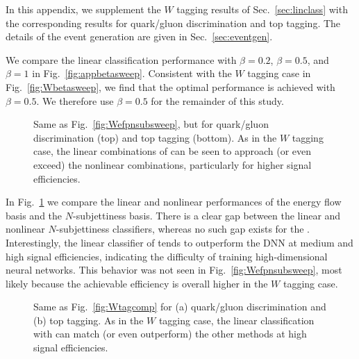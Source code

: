 \documentclass[letterpaper,11pt]{article}
\DeclareRobustCommand{\Sec}[1]{Sec.~\ref{#1}}
\DeclareRobustCommand{\Fig}[1]{Fig.~\ref{#1}}
\newcommand{\B}{\text{EFP}\xspace}
\newcommand{\Bs}{\text{EFPs}\xspace}
\begin{document}
In this appendix, we supplement the $W$ tagging results of \Sec{sec:linclass} with the corresponding results for quark/gluon discrimination and top tagging.
%
The details of the event generation are given in \Sec{sec:eventgen}.

We compare the \B linear classification performance with $\beta = 0.2$, $\beta = 0.5$, and $\beta = 1$ in \Fig{fig:appbetasweep}.  
%
Consistent with the $W$ tagging case in \Fig{fig:Wbetasweep}, we find that the optimal performance is achieved with $\beta = 0.5$.  We therefore use $\beta = 0.5$ for the remainder of this study.

\begin{figure}[t]
\centering
{}

\caption{Same as \Fig{fig:Wefpnsubsweep}, but for quark/gluon discrimination (top) and top tagging (bottom).  As in the $W$ tagging case, the linear combinations of \Bs can be seen to approach (or even exceed) the nonlinear combinations, particularly for higher signal efficiencies.
\label{fig:appefpnsubsweep}}
\end{figure}

In \Fig{fig:appefpnsubsweep} we compare the linear and nonlinear performances of the energy flow basis and the $N$-subjettiness basis.
%
There is a clear gap between the linear and nonlinear $N$-subjettiness classifiers, whereas no such gap exists for the \Bs.  Interestingly, the linear classifier of \Bs tends to outperform the DNN at medium and high signal efficiencies, indicating the difficulty of training high-dimensional neural networks.
%
This behavior was not seen in \Fig{fig:Wefpnsubsweep}, most likely because the achievable efficiency is overall higher in the $W$ tagging case.

\begin{figure}[t]
\centering
{}
\caption{Same as \Fig{fig:Wtagcomp} for (a) quark/gluon discrimination and (b) top tagging.
As in the $W$ tagging case, the linear classification with \Bs can match (or even outperform) the other methods at high signal efficiencies.}
\label{fig:apptagcomp}
\end{figure}
\end{document}
